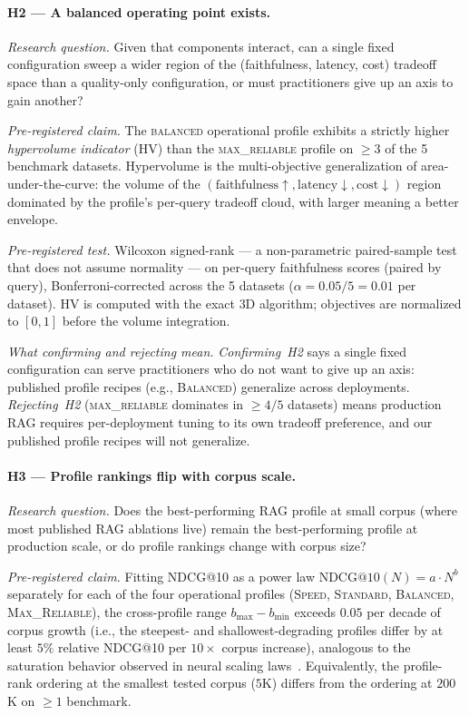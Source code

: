 \paragraph{H2 --- A balanced operating point exists.}

\textit{Research question.} Given that components interact, can a
single fixed configuration sweep a wider region of the (faithfulness,
latency, cost) tradeoff space than a quality-only configuration, or
must practitioners give up an axis to gain another?

\textit{Pre-registered claim.} The \textsc{balanced} operational
profile exhibits a strictly higher \emph{hypervolume indicator} (HV)
than the \textsc{max\_reliable} profile on $\geq 3$ of the 5 benchmark
datasets.  Hypervolume is the multi-objective generalization of
area-under-the-curve: the volume of the
$(\text{faithfulness}{\uparrow}, \text{latency}{\downarrow}, \text{cost}{\downarrow})$
region dominated by the profile's per-query tradeoff cloud, with
larger meaning a better envelope.

\textit{Pre-registered test.} Wilcoxon signed-rank --- a non-parametric
paired-sample test that does not assume normality --- on per-query
faithfulness scores (paired by query), Bonferroni-corrected across
the 5 datasets ($\alpha = 0.05 / 5 = 0.01$ per dataset).  HV is
computed with the exact 3D algorithm; objectives are normalized to
$[0,1]$ before the volume integration.

\textit{What confirming and rejecting mean.} \emph{Confirming~H2}
says a single fixed configuration can serve practitioners who do not
want to give up an axis: published profile recipes (e.g.,
\textsc{Balanced}) generalize across deployments.
\emph{Rejecting~H2} (\textsc{max\_reliable} dominates in $\geq 4/5$
datasets) means production RAG requires per-deployment tuning to its
own tradeoff preference, and our published profile recipes will not
generalize.

\paragraph{H3 --- Profile rankings flip with corpus scale.}

\textit{Research question.} Does the best-performing RAG profile at
small corpus (where most published RAG ablations live) remain the
best-performing profile at production scale, or do profile rankings
change with corpus size?

\textit{Pre-registered claim.} Fitting NDCG@10 as a power law
$\text{NDCG@10}(N) = a \cdot N^{b}$ separately for each of the four
operational profiles (\textsc{Speed}, \textsc{Standard},
\textsc{Balanced}, \textsc{Max\_Reliable}), the cross-profile range
$b_{\max} - b_{\min}$ exceeds $0.05$ per decade of corpus growth
(i.e., the steepest- and shallowest-degrading profiles differ by at
least $5\%$ relative NDCG@10 per $10\times$ corpus increase),
analogous to the saturation behavior observed in neural scaling
laws~\citep{kaplan2020scaling}.  Equivalently, the profile-rank
ordering at the smallest tested corpus ($5$K) differs from the
ordering at $200$K on $\geq 1$ benchmark.

